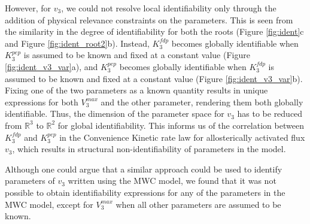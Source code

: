 \documentclass[10pt]{article}
\begin{document}
	However, for $v_3$, we could not resolve local identifiability only through the addition of physical relevance constraints on the parameters. This is seen from the similarity in the degree of identifiability for both the roots (Figure \ref{fig:ident}c and Figure \ref{fig:ident_root2}b). Instead, $K_3^{fdp}$ becomes globally identifiable when $K_3^{pep}$ is assumed to be known and fixed at a constant value (Figure \ref{fig:ident_v3_var}a), and $K_3^{pep}$ becomes globally identifiable when $K_3^{fdp}$ is assumed to be known and fixed at a constant value (Figure \ref{fig:ident_v3_var}b). Fixing one of the two parameters as a known quantity results in unique expressions for both $V_3^{max}$ and the other parameter, rendering them both globally identifiable. Thus, the dimension of the parameter space for $v_3$ has to be reduced from $\mathbb{R}^3$ to $\mathbb{R}^2$ for global identifiability. This informs us of the correlation between $K_3^{fdp}$ and $K_3^{pep}$ in the Convenience Kinetic rate law for allosterically activated flux $v_3$, which results in structural non-identifiability of parameters in the model.
	
	 Although one could argue that a similar approach could be used to identify parameters of $v_3$ written using the MWC model, we found that it was not possible to obtain identifiability expressions for any of the parameters in the MWC model, except for $V_3^{max}$ when all other parameters are assumed to be known.	
	 
	
\end{document}
